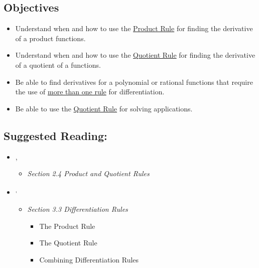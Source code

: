 \vspace{-0.25 in}
\begin{framed}
\subsection*{Objectives}
\begin{itemize}
    \item Understand when and how to use the \underline{Product Rule} for finding the derivative of a product functions.
    \item Understand when and how to use the \underline{Quotient Rule} for finding the derivative of a quotient of a functions.
    \item Be able to find derivatives for a polynomial or rational functions that require the use of \underline{more than one rule} for differentiation.
    \item Be able to use the \underline{Quotient Rule} for solving applications.
\end{itemize}

\subsection*{Suggested Reading:}
\begin{itemize}
\item \cite{Calaway}\footnotemark[1],\footnotemark[2]
   \begin{itemize}
        \item \emph{Section 2.4 Product and Quotient Rules}
    \end{itemize}

\item \cite{openstax}\footnotemark[3]\textsuperscript{,}\footnotemark[4]
    \begin{itemize}
        \item \emph{Section 3.3 Differentiation Rules}
        \begin{itemize}
            \item The Product Rule
            \item The Quotient Rule
            \item Combining Differentiation Rules
            
        \end{itemize}
    \end{itemize}

\end{itemize}

\end{framed}
